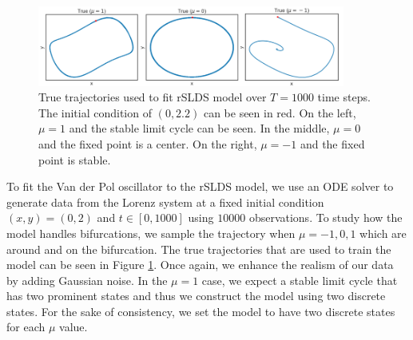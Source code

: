 \begin{figure}
    \centering
    \includegraphics[width=0.90\textwidth,height=\textwidth,keepaspectratio]{./figures/paper_fig10.png}
    \caption{True trajectories used to fit rSLDS model over $T=1000$ time steps. The initial condition of $(0,2.2)$ can be seen in red. On the left, $\mu =1$ and the stable limit cycle can be seen. In the middle, $\mu = 0$ and the fixed point is a center. On the right, $\mu = -1$ and the fixed point is stable.}
    \label{trueVDP}
\end{figure}

To fit the Van der Pol oscillator to the rSLDS model, we use an ODE solver to generate data from the Lorenz system at a fixed initial condition $(x,y) = (0,2)$ and $t \in [0,1000]$ using $10000$ observations. To study how the model handles bifurcations, we sample the trajectory when $\mu = -1,0,1$ which are around and on the bifurcation. The true trajectories that are used to train the model can be seen in Figure \ref{trueVDP}. Once again, we enhance the realism of our data by adding Gaussian noise. In the $\mu = 1$ case, we expect a stable limit cycle that has two prominent states and thus we construct the model using two discrete states. For the sake of consistency, we set the model to have two discrete states for each $\mu$ value. 

